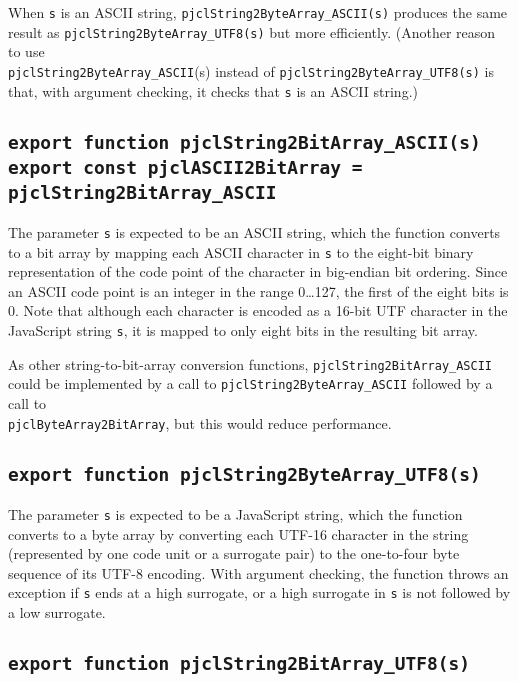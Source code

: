 \documentclass[12pt]{article}
\begin{document}
When {\tt s} is an ASCII string, {\tt pjclString2ByteArray\_ASCII(s)}
produces the same result as {\tt pjclString2ByteArray\_UTF8(s)}
but more efficiently.  (Another reason to use\\
{\tt pjclString2ByteArray\_ASCII}(s) instead of {\tt pjclString2ByteArray\_UTF8(s)} 
is that, with argument checking, it checks that {\tt s} is an ASCII string.)

\subsection{\tt export function pjclString2BitArray\_ASCII(s)\\export const pjclASCII2BitArray = pjclString2BitArray\_ASCII}

The parameter {\tt s} is expected to be an ASCII string, which the
function converts to a bit array by mapping each ASCII character in
{\tt s} to the eight-bit binary representation of the code point of the character
in big-endian bit ordering.  Since an
ASCII code point is an integer in the range 0\ldots 127, the first of the eight
bits is 0.  Note that although each character is encoded as a 16-bit
UTF character in the JavaScript string {\tt s}, it is mapped to only eight
bits in the resulting bit array.

As other string-to-bit-array conversion functions, {\tt pjclString2BitArray\_ASCII}
could be implemented by a call to {\tt pjclString2ByteArray\_ASCII}
followed by a call to\\
{\tt pjclByteArray2BitArray}, but this would reduce performance.

\subsection{\tt export function pjclString2ByteArray\_UTF8(s)}

The parameter {\tt s} is expected to be a JavaScript string, which the
function converts to a byte array by 
converting each UTF-16 character in the string (represented by one code unit
or a surrogate pair) to the one-to-four byte sequence of its UTF-8 encoding.
With argument checking, the function throws an exception if {\tt s} ends at 
a high surrogate, or a high surrogate in {\tt s} is not followed by a low surrogate.

\subsection{\tt export function pjclString2BitArray\_UTF8(s)}
\end{document}
